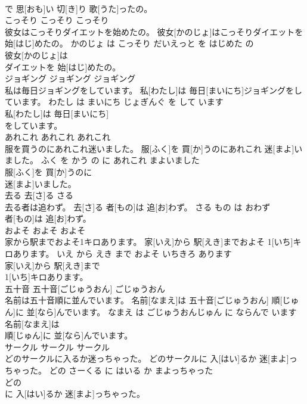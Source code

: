 \documentclass[8pt]{extreport}
\begin{document}
\begin{CJK}{UTF8}{min}
\\	で 思[おも]い 切[き]り 歌[うた]ったの。			
\\	こっそり	こっそり	こっそり	
\\	彼女はこっそりダイエットを始めたの。	彼女[かのじょ]はこっそりダイエットを 始[はじ]めたの。	かのじょ は こっそり だいえっと を はじめた の	
\\	彼女[かのじょ]は
\\	ダイエットを 始[はじ]めたの。			
\\	ジョギング	ジョギング	ジョギング	
\\	私は毎日ジョギングをしています。	私[わたし]は 毎日[まいにち]ジョギングをしています。	わたし は まいにち じょぎんぐ を して います	
\\	私[わたし]は 毎日[まいにち]
\\	をしています。			
\\	あれこれ	あれこれ	あれこれ	
\\	服を買うのにあれこれ迷いました。	服[ふく]を 買[か]うのにあれこれ 迷[まよ]いました。	ふく を かう の に あれこれ まよいました	
\\	服[ふく]を 買[か]うのに
\\	迷[まよ]いました。			
\\	去る	去[さ]る	さる	
\\	去る者は追わず。	去[さ]る 者[もの]は 追[お]わず。	さる もの は おわず	
\\	者[もの]は 追[お]わず。			
\\	およそ	およそ	およそ	
\\	家から駅までおよそ1キロあります。	家[いえ]から 駅[えき]までおよそ 1[いち]キロあります。	いえ から えき まで およそ いちきろ あります	
\\	家[いえ]から 駅[えき]まで
\\	1[いち]キロあります。			
\\	五十音	五十音[ごじゅうおん]	ごじゅうおん	
\\	名前は五十音順に並んでいます。	名前[なまえ]は 五十音[ごじゅうおん] 順[じゅん]に 並[なら]んでいます。	なまえ は ごじゅうおんじゅん に ならんで います	
\\	名前[なまえ]は
\\	順[じゅん]に 並[なら]んでいます。			
\\	サークル	サークル	サークル	
\\	どのサークルに入るか迷っちゃった。	どのサークルに 入[はい]るか 迷[まよ]っちゃった。	どの さーくる に はいる か まよっちゃった	
\\	どの
\\	に 入[はい]るか 迷[まよ]っちゃった。			

\end{CJK}
\end{document}
